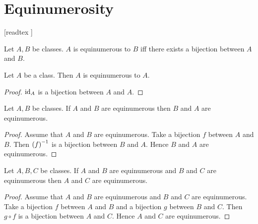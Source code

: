\documentclass[../../set-theory/set-theory.tex]{subfiles}
\begin{document}
  \chapter{Equinumerosity}\label{chapter:equinumerosity}


  \begin{forthel}

    [readtex ]

  \end{forthel}


  \begin{forthel}
    \begin{definition}
      Let $A, B$ be classes.
      $A$ is equinumerous to $B$ iff there exists a bijection between $A$ and
      $B$.
    \end{definition}
  \end{forthel}

  \begin{forthel}
    \begin{proposition}
      Let $A$ be a class.
      Then $A$ is equinumerous to $A$.
    \end{proposition}
    \begin{proof}
      $\mathrm{id}_{A}$ is a bijection between $A$ and $A$.
    \end{proof}
  \end{forthel}

  \begin{forthel}
    \begin{proposition}
      Let $A, B$ be classes.
      If $A$ and $B$ are equinumerous then $B$ and $A$ are equinumerous.
    \end{proposition}
    \begin{proof}
      Assume that $A$ and $B$ are equinumerous.
      Take a bijection $f$ between $A$ and $B$.
      Then $\left(f\right)^{-1}$ is a bijection between $B$ and $A$.
      Hence $B$ and $A$ are equinumerous.
    \end{proof}
  \end{forthel}

  \begin{forthel}
    \begin{proposition}
      Let $A, B, C$ be classes.
      If $A$ and $B$ are equinumerous and $B$ and $C$ are equinumerous then
      $A$ and $C$ are equinumerous.
    \end{proposition}
    \begin{proof}
      Assume that $A$ and $B$ are equinumerous and $B$ and $C$ are
      equinumerous.
      Take a bijection $f$ between $A$ and $B$ and a bijection $g$ between
      $B$ and $C$.
      Then $g \circ f$ is a bijection between $A$ and $C$.
      Hence $A$ and $C$ are equinumerous.
    \end{proof}
  \end{forthel}
\end{document}
